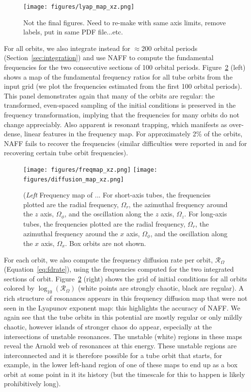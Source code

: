 \documentclass[letterpaper,12pt,preprint]{aastex}
\newcommand{\fdrate}{\mathcal{R}_\Omega}
\begin{document}
\begin{figure}[!h]
\centering
	\texttt{[image: figures/lyap\_map\_xz.png]}
	\caption{Not the final figures. Need to re-make with same axis limits, remove labels, put in same PDF file...etc.} 
	\label{fig:lyapmap}
\end{figure}

For all orbits, we also integrate instead for $\approx$200 orbital periods (Section~\ref{sec:integration}) and use NAFF to compute the fundamental frequencies for the two consecutive sections of 100 orbital periods. Figure~\ref{fig:freqmap} (left) shows a map of the fundamental frequency ratios for all tube orbits from the input grid (we plot the frequencies estimated from the first 100 orbital periods). This panel demonstrates again that many of the orbits are regular: the transformed, even-spaced sampling of the initial conditions is preserved in the frequency transformation, implying that the frequencies for many orbits do not change appreciably. Also apparent is resonant trapping, which manifests as over-dense, linear features in the frequency map. For approximately 2\% of the orbits, NAFF fails to recover the frequencies (similar difficulties were reported in \cite{valluri98} and \cite{papaphilippou96} for recovering certain tube orbit frequencies).

\begin{figure}[h]
\centering
	\texttt{[image: figures/freqmap\_xz.png]}
	\texttt{[image: figures/diffusion\_map\_xz.png]}
	\caption{(\emph{Left} Frequency map of ... For short-axis tubes, the frequencies plotted are the radial frequency, $\Omega_r$, the azimuthal frequency around the $z$ axis, $\Omega_\phi$, and the oscillation along the $z$ axis, $\Omega_z$. For long-axis tubes, the frequencies plotted are the radial frequency, $\Omega_r$, the azimuthal frequency around the $x$ axis, $\Omega_\phi$, and the oscillation along the $x$ axis, $\Omega_x$. Box orbits are not shown.} 
	\label{fig:freqmap}
\end{figure}

For each orbit, we also compute the frequency diffusion rate per orbit, $\fdrate$ (Equation~\ref{eq:fdrate}), using the frequencies computed for the two integrated sections of orbit. Figure~\ref{fig:freqmap} (right) shows the grid of initial conditions for all orbits colored by $\log_{10}(\fdrate)$ (white points are strongly chaotic, black are regular). A rich structure of resonances appears in this frequency diffusion map that were not seen in the Lyapunov exponent map: this highlights the accuracy of NAFF. We again see that the tube orbits in this potential are mostly regular or only mildly chaotic, however islands of stronger chaos do appear, especially at the intersections of unstable resonances. The unstable (white) regions in these maps reveal the Arnold web of resonances at this energy. These unstable regions are interconnected and it is therefore possible for a tube orbit that starts, for example, in the lower left-hand region of one of these maps to end up as a box orbit at some point in it its history (but the timescale for this to happen is likely prohibitively long). 
\end{document}
